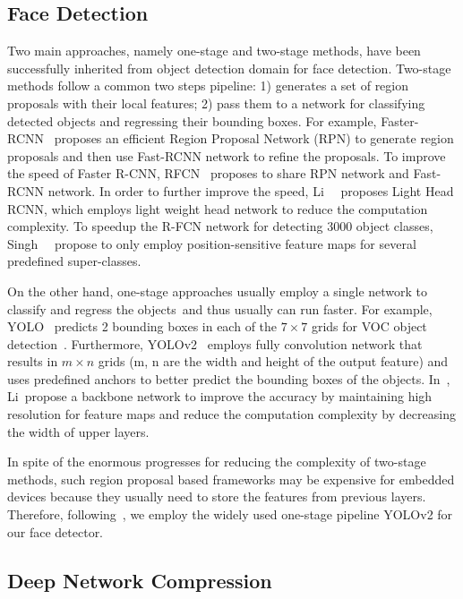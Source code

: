 \documentclass[10pt,twocolumn,letterpaper]{article}
\begin{document}
\subsection{Face Detection}
Two main approaches, namely one-stage and two-stage methods,  have been successfully inherited from object detection domain for face detection. Two-stage methods follow a common two steps pipeline: 1) generates a set of region proposals with their local features; 2) pass them to a network for classifying detected objects and regressing their bounding boxes. For example, Faster-RCNN~\cite{FasterRCNN} proposes an efficient Region Proposal Network (RPN) to generate region proposals and then use Fast-RCNN network to refine the proposals. To improve the speed of Faster R-CNN,  RFCN~\cite{RFCN} proposes to share RPN network and Fast-RCNN network. In order to further improve the speed, Li~\etal~\cite{LightHeadRCNN} proposes Light Head RCNN, which employs light weight head network to reduce the computation complexity. To speedup the R-FCN network for detecting 3000 object classes, Singh~\etal ~\cite{RFCN-3000} propose to only employ position-sensitive feature maps for several predefined super-classes.

On the other hand, one-stage approaches usually employ a single network to classify and regress the objects~\cite{SSD,YOLO,YOLOv2}and thus usually can run faster. For example, YOLO~\cite{YOLO} predicts 2 bounding boxes in each of the $7\times7$ grids for VOC object detection~\cite{VOC}. Furthermore, YOLOv2~\cite{YOLOv2} employs fully convolution network that results in $m\times n$ grids (m, n are the width and height of the output feature) and uses predefined anchors to better predict the bounding boxes of the objects. In~\cite{DetNet}, Li~\etal propose a backbone network to improve the accuracy by maintaining high resolution for feature maps and reduce the computation complexity by decreasing the width of upper layers.


In spite of the enormous progresses for reducing the complexity of two-stage methods, such region proposal based frameworks may be expensive for embedded devices because they usually need to store the features from previous layers. Therefore, following~\cite{IFQNet}, we employ  the widely used one-stage pipeline YOLOv2 for our face detector.






\subsection{Deep Network Compression}
\end{document}
